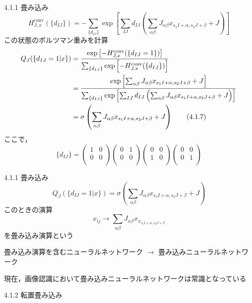 \documentclass[dvipdfmx,8pt]{beamer}
\begin{document}
  \begin{frame}{4.1.1 畳み込み}
    \begin{equation*}
      H_{J,x}^{\text{conv}}(\{d_{IJ}\}) = -\sum_{\{d_{IJ}\}}\exp\left[\sum_{IJ}d_{IJ}\left(\sum_{\alpha\beta}J_{\alpha\beta}x_{s_1I+\alpha,s_2J+\beta}+J\right)\right] \tag{4.1.6}
    \end{equation*}
    この状態のボルツマン重みを計算
    \begin{align}
      Q_J(\{d_{IJ}=1|x\})
      &=\frac{\exp\left[-H_{J,x}^{\text{conv}}(\{d_{IJ}=1\})\right]}{\sum_{\{d_{IJ}\}}\exp\left[-H_{J,x}^{\text{conv}}(\{d_{IJ}\})\right]}\notag\\
      &=\frac{\exp\left[\sum_{\alpha\beta}J_{\alpha\beta}x_{s_1I+\alpha,s_2J+\beta}+J\right]}{\sum_{\{d_{IJ}\}}\exp\left[\sum_{IJ}d_{IJ}\left(\sum_{\alpha\beta}J_{\alpha\beta}x_{s_1I+\alpha,s_2J+\beta}+J\right)\right]}\notag\\
      &= \sigma\left(\sum_{\alpha\beta}J_{\alpha\beta}x_{s_1I+\alpha,s_2J+\beta}+J\right) \tag{4.1.7}
    \end{align}
    ここで，
    \begin{equation*}
      \{d_{IJ}\}=
      \begin{pmatrix}
        1&0\\0&0\\
      \end{pmatrix}
      \begin{pmatrix}
        0&1\\0&0\\
      \end{pmatrix}
      \begin{pmatrix}
        0&0\\1&0\\
      \end{pmatrix}
      \begin{pmatrix}
        0&0\\0&1\\
      \end{pmatrix}
    \end{equation*}
  \end{frame}

  \begin{frame}{4.1.1 畳み込み}
    \begin{equation*}
      Q_J(\{d_{IJ}=1|x\})
      = \sigma\left(\sum_{\alpha\beta}J_{\alpha\beta}x_{s_1I+\alpha,s_2J+\beta}+J\right) \tag{4.1.7}
    \end{equation*}
    このときの演算
    \begin{equation}
      x_{ij} \rightarrow \sum_{\alpha\beta}J_{\alpha\beta}x_{x_{s_1I+\alpha,s_2J+\beta}} \tag{4.1.8}
    \end{equation}
    を畳み込み演算という\\
    \vspace{0.3cm}
    \begin{center}
    畳み込み演算を含むニューラルネットワーク $\rightarrow$ 畳み込みニューラルネットワーク
    \end{center}
    \vspace{0.3cm}
    現在，画像認識において畳み込みニューラルネットワークは常識となっている
  \end{frame}

  \begin{frame}{4.1.2 転置畳み込み}


  \end{frame}
\end{document}
